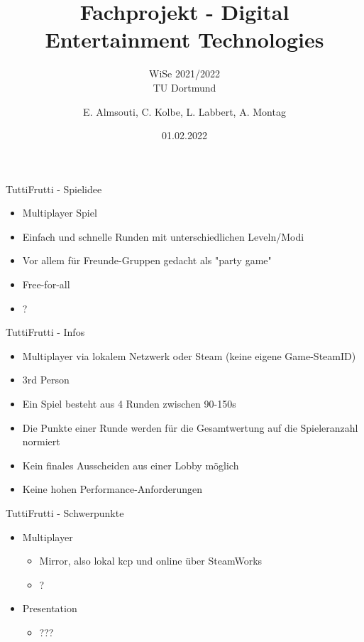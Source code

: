 \documentclass[xcolor=dvipsnames]{beamer}
\title{Fachprojekt - Digital Entertainment Technologies}
\subtitle{WiSe 2021/2022 \\ TU Dortmund}
\author{E. Almsouti, C. Kolbe,  L. Labbert, A. Montag}
\institute{}
\date{01.02.2022}
\begin{document}
\begin{frame}
\titlepage
\end{frame}

\begin{frame}{TuttiFrutti - Spielidee}
\begin{itemize}
\item Multiplayer Spiel
\item Einfach und schnelle Runden mit unterschiedlichen Leveln/Modi \item Vor allem für Freunde-Gruppen gedacht als "party game"
\item Free-for-all 
\item ?
\end{itemize}

\end{frame}

\begin{frame}{TuttiFrutti - Infos}
\begin{itemize}
\item  Multiplayer via lokalem Netzwerk oder Steam (keine eigene Game-SteamID) 
\item 3rd Person
\item Ein Spiel besteht aus 4 Runden zwischen 90-150s 
\item Die Punkte einer Runde werden für die Gesamtwertung auf die Spieleranzahl normiert
\item Kein finales Ausscheiden aus einer Lobby möglich
\item Keine hohen Performance-Anforderungen 

\end{itemize}

\end{frame}

\begin{frame}{TuttiFrutti - Schwerpunkte}
\begin{itemize}
	\item Multiplayer
	\begin{itemize}
		\item Mirror, also lokal kcp und online über SteamWorks
		\item ?
	\end{itemize}
	\item Presentation
	\begin{itemize}
		\item ???
	\end{itemize}
\end{itemize}

\end{frame}
\end{document}
